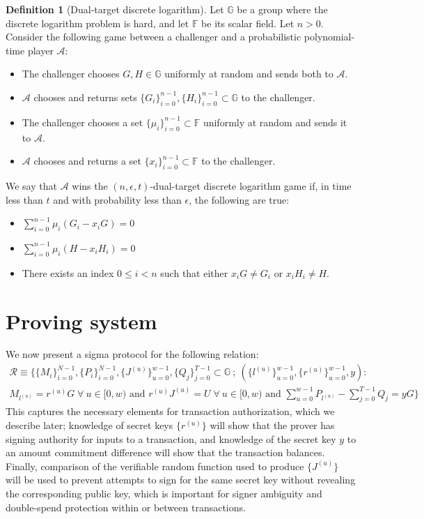 \documentclass{article}
\newcommand{\G}{\mathbb{G}}
\newcommand{\F}{\mathbb{F}}
\newcommand{\A}{\mathcal{A}}
\newcommand{\sumi}{\sum_{i=0}^{n-1}}
\theoremstyle{definition}
\newtheorem{definition}{Definition}
\begin{document}
\begin{definition}[Dual-target discrete logarithm]
\label{def:dual}
Let $\G$ be a group where the discrete logarithm problem is hard, and let $\F$ be its scalar field.
Let $n > 0$.
Consider the following game between a challenger and a probabilistic polynomial-time player $\A$:
\begin{itemize}
\item The challenger chooses $G,H \in \G$ uniformly at random and sends both to $\A$.
\item $\A$ chooses and returns sets $\{G_i\}_{i=0}^{n-1},\{H_i\}_{i=0}^{n-1} \subset \G$ to the challenger.
\item The challenger chooses a set $\{\mu_i\}_{i=0}^{n-1} \subset \F$ uniformly at random and sends it to $\A$.
\item $\A$ chooses and returns a set $\{x_i\}_{i=0}^{n-1} \subset \F$ to the challenger.
\end{itemize}
We say that $\A$ wins the $(n,\epsilon,t)$-dual-target discrete logarithm game if, in time less than $t$ and with probability less than $\epsilon$, the following are true:
\begin{itemize}
\item $\sumi \mu_i \left( G_i - x_iG \right) = 0$
\item $\sumi \mu_i \left( H - x_iH_i \right) = 0$
\item There exists an index $0 \leq i < n$ such that either $x_iG \neq G_i$ or $x_iH_i \neq H$.
\end{itemize}
\end{definition}


\section{Proving system}
We now present a sigma protocol for the following relation:
\begin{multline*}
\mathcal{R} \equiv \Bigg\{ \{M_i\}_{i=0}^{N-1},\{P_i\}_{i=0}^{N-1},\{J^{(u)}\}_{u=0}^{w-1},\{Q_j\}_{j=0}^{T-1} \subset \G \: ; \: \left( \{l^{(u)}\}_{u=0}^{w-1}, \{r^{(u)}\}_{u=0}^{w-1}, y \right) : \\
M_{l^{(u)}} = r^{(u)}G \; \forall \: u \in [0,w) \text{ and } r^{(u)}J^{(u)} = U \; \forall \: u \in [0,w) \text{ and } \sum_{u=0}^{w-1} P_{l^{(u)}} - \sum_{j=0}^{T-1} Q_j = yG \Bigg\}
\end{multline*}
This captures the necessary elements for transaction authorization, which we describe later; knowledge of secret keys $\{r^{(u)}\}$ will show that the prover has signing authority for inputs to a transaction, and knowledge of the secret key $y$ to an amount commitment difference will show that the transaction balances.
Finally, comparison of the verifiable random function used to produce $\{J^{(u)}\}$ will be used to prevent attempts to sign for the same secret key without revealing the corresponding public key, which is important for signer ambiguity and double-spend protection within or between transactions.
\end{document}
